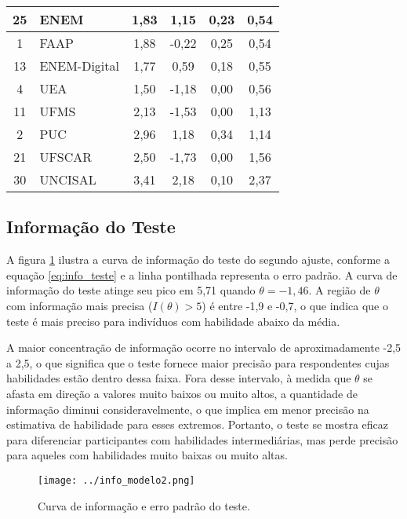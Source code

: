 \begin{table}[H]
{\begin{tabular*}{.8\textwidth}{@{\extracolsep{\fill}}clcccc@{}}
\midrule 25 & ENEM & 1,83 & 1,15 & 0,23 & 0,54 \\ 
\midrule 1 & FAAP & 1,88 & -0,22 & 0,25 & 0,54 \\ 
\midrule 13 & ENEM-Digital & 1,77 & 0,59 & 0,18 & 0,55 \\ 
\midrule 4 & UEA & 1,50 & -1,18 & 0,00 & 0,56 \\ 
\midrule 11 & UFMS & 2,13 & -1,53 & 0,00 & 1,13 \\ 
\midrule 2 & PUC & 2,96 & 1,18 & 0,34 & 1,14 \\ 
\midrule 21 & UFSCAR & 2,50 & -1,73 & 0,00 & 1,56 \\ 
\midrule 30 & UNCISAL & 3,41 & 2,18 & 0,10 & 2,37 \\
\bottomrule
		\end{tabular*}
	}{%
			}
\end{table}



\subsection{Informação do Teste}

A figura \ref{fig:info} ilustra a curva de informação do teste do segundo ajuste, conforme a equação \ref{eq:info_teste} e a linha pontilhada representa o erro padrão. A curva de informação do teste atinge seu pico em 5,71 quando $\theta = -1,46$. A região de $\theta$ com informação mais precisa ($I(\theta) > 5$) é entre -1,9 e -0,7, o que indica que o teste é mais preciso para indivíduos com habilidade abaixo da média. 

A maior concentração de informação ocorre no intervalo de aproximadamente -2,5 a 2,5, o que significa que o teste fornece maior precisão para respondentes cujas habilidades estão dentro dessa faixa. Fora desse intervalo, à medida que $\theta$ se afasta em direção a valores muito baixos ou muito altos, a quantidade de informação diminui consideravelmente, o que implica em menor precisão na estimativa de habilidade para esses extremos. Portanto, o teste se mostra eficaz para diferenciar participantes com habilidades intermediárias, mas perde precisão para aqueles com habilidades muito baixas ou muito altas.

\begin{figure}[!htbp]
	\centering
	\caption{Curva de informação e erro padrão do teste.}
	\texttt{[image: ../info\_modelo2.png]}
	\parbox{\textwidth}{
		\centering %
	}
	\label{fig:info}
\end{figure}


